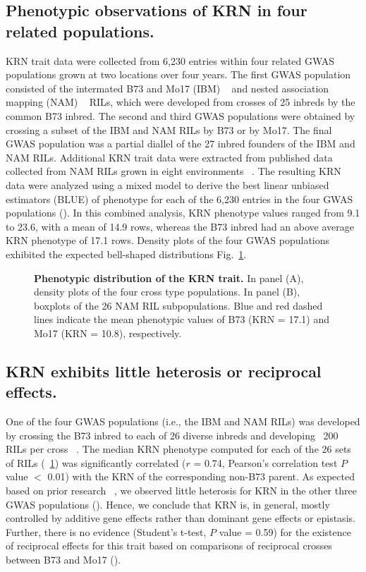 \documentclass[10pt,letterpaper]{article}
\begin{document}
\subsection*{Phenotypic observations of KRN in four related populations.}

KRN trait data were collected from 6,230 entries within four related GWAS populations grown at two locations over four years. The first GWAS population consisted of the intermated B73 and Mo17 (IBM) ~\cite{Lee2002} and nested association mapping (NAM) ~\cite{Yu2008} RILs, which were developed from crosses of 25 inbreds by the common B73 inbred. The second and third GWAS populations were obtained by crossing a subset of the IBM and NAM RILs by B73 or by Mo17.  The final GWAS population was a partial diallel of the 27 inbred founders of the IBM and NAM RILs. Additional KRN trait data were extracted from published data collected from NAM RILs grown in eight environments ~\cite{Brown2011}. The resulting KRN data were analyzed using a mixed model to derive the best linear unbiased estimators (BLUE) of phenotype for each of the 6,230 entries in the four GWAS populations (). In this combined analysis, KRN phenotype values ranged from 9.1 to 23.6, with a mean of 14.9 rows, whereas the B73 inbred had an above average KRN phenotype of 17.1 rows. Density plots of the four GWAS populations exhibited the expected bell-shaped distributions Fig.~\ref{fig1}.

\begin{figure}[h]
\caption{{\bf Phenotypic distribution of the KRN trait.}
In panel (A), density plots of the four cross type populations. In panel (B), boxplots of the 26 NAM RIL subpopulations. Blue and red dashed lines indicate the mean phenotypic values of B73 (KRN = 17.1) and Mo17 (KRN = 10.8), respectively.}
\label{fig1}
\end{figure}

\subsection*{KRN exhibits little heterosis or reciprocal effects.}
One of the four GWAS populations (i.e., the IBM and NAM RILs) was developed by crossing the B73 inbred to each of 26 diverse inbreds and developing ~200 RILs per cross ~\cite{Lee2002, McMullen2009}. The median KRN phenotype computed for each of the 26 sets of RILs (~\ref{fig1}) was significantly correlated ($r$ = 0.74, Pearson’s correlation test $P$ value $<$ 0.01) with the KRN of the corresponding non-B73 parent. As expected based on prior research ~\cite{Srdic2007, Toledo2011}, we observed little heterosis for KRN in the other three GWAS populations (). Hence, we conclude that KRN is, in general, mostly controlled by additive gene effects rather than dominant gene effects or epistasis. Further, there is no evidence (Student’s t-test, $P$ value = 0.59) for the existence of reciprocal effects for this trait based on comparisons of reciprocal crosses between B73 and Mo17 ().
\end{document}
